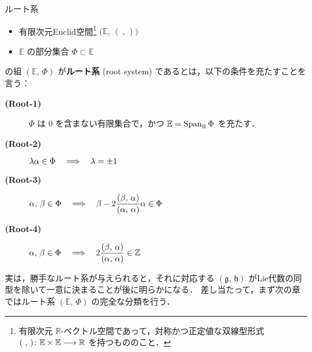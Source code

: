 \documentclass[rep_main]{subfiles}
\begin{document}
\begin{myaxiom}[label=ax:root-system-2,breakable]{ルート系}
	\begin{itemize}
		\item 有限次元Euclid空間\footnote{有限次元 $\mathbb{R}$-ベクトル空間であって，対称かつ正定値な双線型形式 $(\;,\, ) \colon \mathbb{E} \times \mathbb{E} \longrightarrow \mathbb{R}$ を持つもののこと．} $\bigl(\mathbb{E},\, (\;,\, )\bigr)$ 
		\item $\mathbb{E}$ の部分集合 $\Phi \subset \mathbb{E}$
	\end{itemize}
	の組 $(\mathbb{E},\, \Phi)$ が\textbf{ルート系} (root system) であるとは，以下の条件を充たすことを言う：
	\begin{description}
		\item[\textbf{(Root-1)}] $\Phi$ は $0$ を含まない有限集合で，かつ $\mathbb{E} = \operatorname{Span}_{\mathbb{R}} \Phi$ を充たす．
		\item[\textbf{(Root-2)}] $\lambda \alpha \in \Phi \quad \Longrightarrow \quad \lambda = \pm 1$
		\item[\textbf{(Root-3)}] $\alpha,\, \beta \in \Phi \quad \Longrightarrow \quad \beta - 2\displaystyle\frac{(\beta,\, \alpha)}{(\alpha,\, \alpha)} \alpha \in \Phi$
		\item[\textbf{(Root-4)}] $\alpha,\, \beta \in \Phi \quad \Longrightarrow \quad 2\displaystyle\frac{(\beta,\, \alpha)}{(\alpha,\, \alpha)} \in \mathbb{Z}$
	\end{description}
\end{myaxiom}

実は，勝手なルート系が与えられると，それに対応する $(\mathfrak{g},\, \mathfrak{h})$ がLie代数の同型を除いて一意に決まることが後に明らかになる．
差し当たって，まず次の章ではルート系 $(\mathbb{E},\, \Phi)$ の完全な分類を行う．
\end{document}
